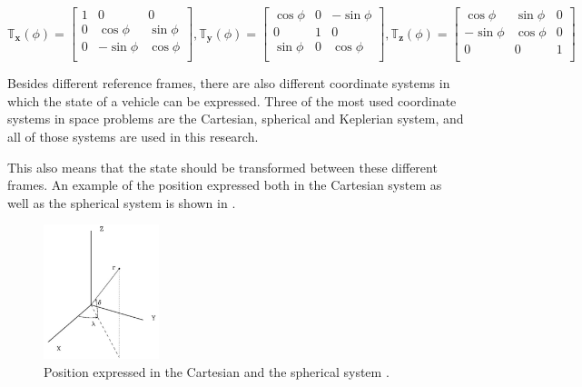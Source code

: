 \begin{equation} \label{eq:allTransMatr}
\mathbb{T}_{\mathbf{x}}(\phi)=\begin{bmatrix}
1 & 0 & 0 \\
0 & \cos\phi & \sin\phi \\
0 & -\sin\phi & \cos\phi \\
\end{bmatrix}, 
\mathbb{T}_{\mathbf{y}}(\phi)=\begin{bmatrix}
\cos\phi & 0 & -\sin\phi \\
0 & 1 & 0\\
\sin\phi & 0 & \cos\phi \\
\end{bmatrix}, 
\mathbb{T}_{\mathbf{z}}(\phi)=\begin{bmatrix}
\cos\phi & \sin\phi & 0\\
- \sin\phi & \cos\phi & 0\\
0 & 0 & 1\\
\end{bmatrix}
\end{equation}


\noindent
Besides different reference frames, there are also different coordinate systems in which the state of a vehicle can be expressed. Three of the most used coordinate systems in space problems are the Cartesian, spherical and Keplerian system, and all of those systems are used in this research. 


This also means that the state should be transformed between these different frames. An example of the position expressed both in the Cartesian system as well as the spherical system is shown in .


\begin{figure}[H]
\centering
\includegraphics[width=0.3\textwidth]{figures/reference_frames/sphertocart_noomen2013basic.jpg}
\caption{Position expressed in the Cartesian and the spherical system \cite{noomen2013basic}.}
\label{fig:sphertocart_noomen2013basicFirst}
\end{figure}

